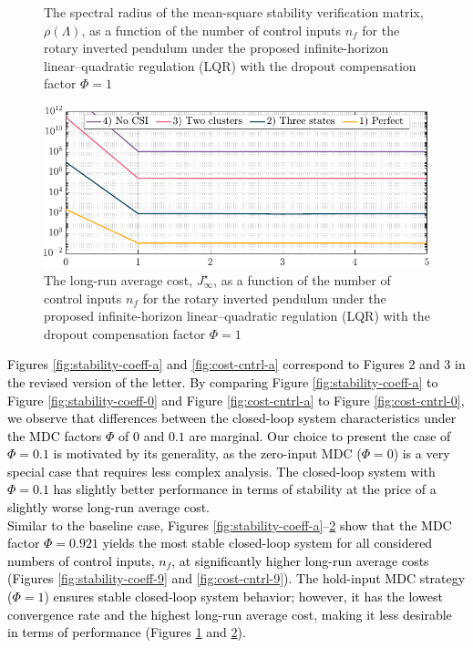 {\begin{figure}[h!]
\begin{center}
\caption{The spectral radius of the mean-square stability verification matrix, $\rho(\mathit{\Lambda})$, as a function of the number of control inputs $n_f$ for the rotary inverted pendulum under the proposed infinite-horizon linear–quadratic regulation (LQR) with the dropout compensation factor $\mathit{\Phi}=1$}\label{fig:stability-coeff-1}
\end{center}
\end{figure}
\begin{figure}[h!]
\begin{center}
\includegraphics[width=0.76\columnwidth]{cost-cntrl-1.pdf}
\caption{The long-run average cost, $J_{\infty}^{\star}$, as a function of the number of control inputs $n_f$ for the rotary inverted pendulum under the proposed infinite-horizon linear–quadratic regulation (LQR) with the dropout compensation factor $\mathit{\Phi}=1$}\label{fig:cost-cntrl-1}
\end{center}
\end{figure}
}
\textcolor{black}{Figures \ref{fig:stability-coeff-a} and \ref{fig:cost-cntrl-a} correspond to Figures 2 and 3 in the revised version of the letter. By comparing Figure \ref{fig:stability-coeff-a} to Figure \ref{fig:stability-coeff-0} and Figure \ref{fig:cost-cntrl-a} to Figure \ref{fig:cost-cntrl-0}, we observe that differences between the closed-loop system characteristics under the MDC factors $\mathit{\Phi}$ of $0$ and $0.1$ are marginal. Our choice to present the case of $\mathit{\Phi}=0.1$ is motivated by its generality, as the zero-input MDC ($\mathit{\Phi}=0$) is a very special case that requires less complex analysis. The closed-loop system with $\mathit{\Phi}=0.1$ has slightly better performance in terms of stability at the price of a slightly worse long-run average cost.\\
Similar to the baseline case, Figures \ref{fig:stability-coeff-a}–\ref{fig:cost-cntrl-1} show that the MDC factor $\mathit{\Phi}=0.921$ yields the most stable closed-loop system for all considered numbers of control inputs, $n_f$, at significantly higher long-run average costs (Figures \ref{fig:stability-coeff-9} and \ref{fig:cost-cntrl-9}). The hold-input MDC strategy ($\mathit{\Phi}=1$) ensures stable closed-loop system behavior; however, it has the lowest convergence rate and the highest long-run average cost, making it less desirable in terms of performance (Figures \ref{fig:stability-coeff-1} and \ref{fig:cost-cntrl-1}).} \\[4mm]
